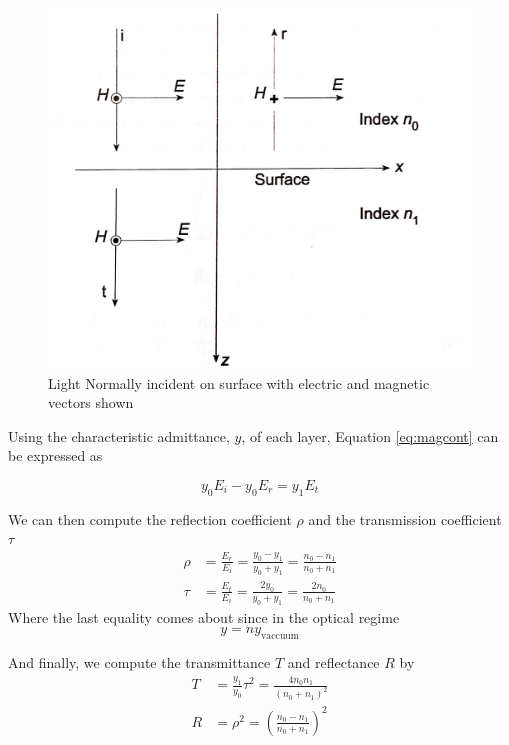\documentclass{article}
\begin{document}
    \begin{figure}
        \includegraphics[width=\linewidth]{simple_boundary_normal.png}
        \caption{Light Normally incident on surface with electric and magnetic vectors shown}
        \label{fig:norm}
    \end{figure}

    Using the characteristic admittance, $y$, of each layer, Equation \ref{eq:magcont} can be expressed as

    \begin{equation}
        y_0 E_i - y_0 E_r = y_1 E_t
    \end{equation}

    We can then compute the reflection coefficient $\rho$ and the transmission coefficient $\tau$
    \begin{align}
        \rho &= \frac{E_r}{E_i} = \frac{y_0 - y_1}{y_0 + y_1} = \frac{n_0 - n_1}{n_0 + n_1} \\
        \tau &= \frac{E_t}{E_i} = \frac{2 y_0}{y_0 + y_1} = \frac{2 n_0}{n_0+n_1}
    \end{align}
    Where the last equality comes about since in the optical regime
    $$ y = n y_{\mathrm{vaccuum}} $$

    And finally, we compute the transmittance $T$ and reflectance $R$ by
    \begin{align}
        T &= \frac{y_1}{y_0}\tau^2 = \frac{4 n_0 n_1}{(n_0 + n_1)^2} \label{eq:trans} \\
        R &= \rho^2 = \left(\frac{n_0 - n_1}{n_0 + n_1}\right)^2 \label{eq:reflec}
    \end{align}
\end{document}
